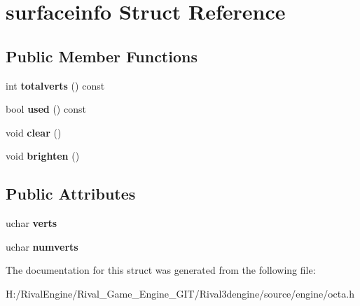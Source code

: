 \hypertarget{structsurfaceinfo}{}\section{surfaceinfo Struct Reference}
\label{structsurfaceinfo}
\subsection*{Public Member Functions}
\begin{DoxyCompactItemize}
\item 
\mbox{\label{structsurfaceinfo_ab6d9a1e0f2e055aa1592e799d6a9e800}} 
int {\bfseries totalverts} () const
\item 
\mbox{\label{structsurfaceinfo_a53c1c781ec6acc1748eab58551cc62e5}} 
bool {\bfseries used} () const
\item 
\mbox{\label{structsurfaceinfo_abd5c4f82cc9b3ce59667de87acadd899}} 
void {\bfseries clear} ()
\item 
\mbox{\label{structsurfaceinfo_a276f2454ae2e78578455b175bf339350}} 
void {\bfseries brighten} ()
\end{DoxyCompactItemize}
\subsection*{Public Attributes}
\begin{DoxyCompactItemize}
\item 
\mbox{\label{structsurfaceinfo_a115000586eac0bd7f8b7202b17604ec3}} 
uchar {\bfseries verts}
\item 
\mbox{\label{structsurfaceinfo_a386fc16a84ca72e92b958b81d486511c}} 
uchar {\bfseries numverts}
\end{DoxyCompactItemize}


The documentation for this struct was generated from the following file\+:\begin{DoxyCompactItemize}
\item 
H\+:/\+Rival\+Engine/\+Rival\+\_\+\+Game\+\_\+\+Engine\+\_\+\+G\+I\+T/\+Rival3dengine/source/engine/octa.\+h\end{DoxyCompactItemize}
